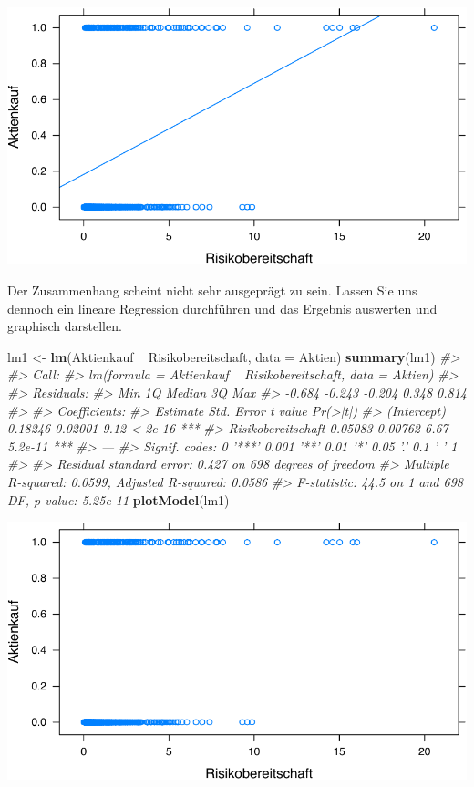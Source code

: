 \documentclass[12pt,ngerman,]{book}
\newenvironment{Shaded}{\begin{snugshade}}{\end{snugshade}}
\newcommand{\KeywordTok}[1]{\textcolor[rgb]{0.13,0.29,0.53}{\textbf{{#1}}}}
\newcommand{\DataTypeTok}[1]{\textcolor[rgb]{0.13,0.29,0.53}{{#1}}}
\newcommand{\StringTok}[1]{\textcolor[rgb]{0.31,0.60,0.02}{{#1}}}
\newcommand{\CommentTok}[1]{\textcolor[rgb]{0.56,0.35,0.01}{\textit{{#1}}}}
\newcommand{\NormalTok}[1]{{#1}}
\renewenvironment{Shaded}{\begin{kframe}}{\end{kframe}}
\begin{document}
\begin{center}\includegraphics[width=0.7\linewidth]{072_klassifizierende_Regression_files/figure-latex/unnamed-chunk-5-1} \end{center}

Der Zusammenhang scheint nicht sehr ausgeprägt zu sein. Lassen Sie uns
dennoch ein lineare Regression durchführen und das Ergebnis auswerten
und graphisch darstellen.

\begin{Shaded}
\begin{Highlighting}[]
\NormalTok{lm1 <-}\StringTok{ }\KeywordTok{lm}\NormalTok{(Aktienkauf ~}\StringTok{ }\NormalTok{Risikobereitschaft, }\DataTypeTok{data =} \NormalTok{Aktien)}
\KeywordTok{summary}\NormalTok{(lm1)}
\CommentTok{#> }
\CommentTok{#> Call:}
\CommentTok{#> lm(formula = Aktienkauf ~ Risikobereitschaft, data = Aktien)}
\CommentTok{#> }
\CommentTok{#> Residuals:}
\CommentTok{#>    Min     1Q Median     3Q    Max }
\CommentTok{#> -0.684 -0.243 -0.204  0.348  0.814 }
\CommentTok{#> }
\CommentTok{#> Coefficients:}
\CommentTok{#>                    Estimate Std. Error t value Pr(>|t|)    }
\CommentTok{#> (Intercept)         0.18246    0.02001    9.12  < 2e-16 ***}
\CommentTok{#> Risikobereitschaft  0.05083    0.00762    6.67  5.2e-11 ***}
\CommentTok{#> ---}
\CommentTok{#> Signif. codes:  0 '***' 0.001 '**' 0.01 '*' 0.05 '.' 0.1 ' ' 1}
\CommentTok{#> }
\CommentTok{#> Residual standard error: 0.427 on 698 degrees of freedom}
\CommentTok{#> Multiple R-squared:  0.0599, Adjusted R-squared:  0.0586 }
\CommentTok{#> F-statistic: 44.5 on 1 and 698 DF,  p-value: 5.25e-11}
\KeywordTok{plotModel}\NormalTok{(lm1)}
\end{Highlighting}
\end{Shaded}

\begin{center}\includegraphics[width=0.7\linewidth]{072_klassifizierende_Regression_files/figure-latex/unnamed-chunk-6-1} \end{center}
\end{document}
